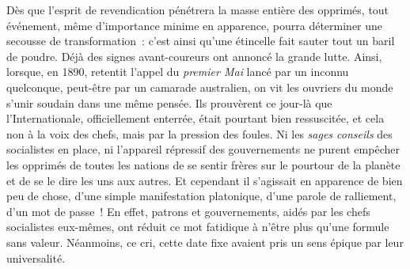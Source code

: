 \documentclass[french,twoside]{book} %
\begin{document}
Dès que l’esprit de revendication pénétrera la masse entière des opprimés, tout événement, même d’importance minime en apparence, pourra déterminer une secousse de transformation : c’est ainsi qu’une étincelle fait sauter tout un baril de poudre. Déjà des signes avant-coureurs ont annoncé la grande lutte. Ainsi, lorsque, en 1890, retentit l’appel du \emph{premier Mai} lancé par un  inconnu quelconque, peut-être par un camarade australien, on vit les ouvriers du monde s’unir soudain dans une même pensée. Ils prouvèrent ce jour-là que l’Internationale, officiellement enterrée, était pourtant bien ressuscitée, et cela non à la voix des chefs, mais par la pression des foules. Ni les \emph{sages conseils} des socialistes en place, ni l’appareil répressif des gouvernements ne purent empêcher les opprimés de toutes les nations de se sentir frères sur le pourtour de la planète et de se le dire les uns aux autres. Et cependant il s’agissait en apparence de bien peu de chose, d’une simple manifestation platonique, d’une parole de ralliement, d’un mot de passe ! En effet, patrons et gouvernements, aidés par les chefs socialistes  eux-mêmes, ont réduit ce mot fatidique à n’être plus qu’une formule sans valeur. Néanmoins, ce cri, cette date fixe avaient pris un sens épique par leur universalité.\par
\end{document}
